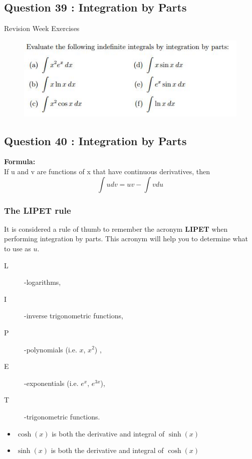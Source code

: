 \documentclass[]{article}
\begin{document}




\subsection*{Question 39 : Integration by Parts}
Revision Week Exercises
\begin{figure}[h!]
	\centering
	\includegraphics[width=0.7\linewidth]{Question26integrationbyparts}
\end{figure}

\subsection*{Question 40 : Integration by Parts}
\begin{framed}
	\textbf{Formula:} \\ If u and v are functions of x that have continuous derivatives,
	then
	\[\int udv = uv - \int vdu\]
\end{framed}
\subsubsection*{The LIPET rule}
It is considered a rule of thumb to remember the acronym \textbf{LIPET}
when performing integration by parts. This acronym will help you to determine
what to use as $u$. 


\begin{description}
	\item[L]-logarithms, 
	\item[I]-inverse trigonometric functions,
	\item[P]-polynomials (i.e. $x$, $x^2$) , 
	\item[E]-exponentials (i.e. $e^x$, $e^{3x}$), 
	\item[T]-trigonometric functions.
\end{description}

\begin{framed}
	\begin{itemize}
		\item
		$\cosh(x)$ is both the derivative and integral of $\sinh(x)$
		
		\item
		$\sinh(x)$ is both the derivative and integral of $\cosh(x)$
	\end{itemize}
\end{framed}
\bigskip
\end{document}

